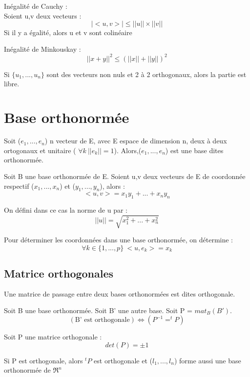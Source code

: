 \begin{prop}
Inégalité de Cauchy : \\
Soient u,v deux vecteurs :
$$|<u,v>| \leq ||u||\times||v||$$
Si il y a égalité, alors u et v sont colinéaire
\end{prop}

\begin{prop}
Inégalité de Minkouskay :
$$||x+y||^2 \leq (||x||+||y||)^2$$
\end{prop}
\begin{prop}
Si $\{u_1,...,u_n\}$ sont des vecteurs non nuls et 2 à 2 orthogonaux, alors la partie est libre.
\end{prop}
\section{Base orthonormée}
\begin{de}
Soit ($e_1,...,e_n$) n vecteur de E, avec E espace de dimension n, deux à deux ortogonaux et unitaire ( $\forall k~ ||e_k|| = 1$).
Alors,($e_1,...,e_n$) est une base dites orthonormée.
\end{de}
\begin{prop}
Soit B une base orthonormée de E. Soient u,v deux vecteurs de E de coordonnée respectif ($x_1,...,x_n$) et ($y_1,...,y_n$), alors :
$$<u,v> = x_1y_1+...+x_ny_n$$
\end{prop}
\begin{prop}
On défini dans ce cas la norme de u par : 
$$||u|| = \sqrt{x_1^2+...+x_n^2}$$
\end{prop}
\begin{prop}
Pour déterminer les coordonnées dans une base orthonormée, on détermine : 
$$\forall k \in \{1,...,p\}~ <u,e_k> = x_k$$
\end{prop}
\subsection{Matrice orthogonales}
\begin{de}
Une matrice de passage entre deux bases orthonormées est dites orthogonale.
\end{de}
\begin{prop}
 Soit B une base orthonormée. Soit B' une autre base. Soit P = $mat_B(B')$.
$$(\mbox{B' est orthogonale}) \Leftrightarrow (P^{-1} = ^tP)$$
\end{prop}
\begin{prop}
Soit P une matrice orthogonale :
$$det(P) = \pm 1$$
\end{prop}
\begin{prop}
Si P est orthogonale, alors $^tP$ est orthogonale et ($l_1,...,l_n$) forme aussi une base orthonormée de $\Re^n$
\end{prop}

